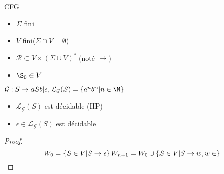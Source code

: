 
\begin{definition} CFG
	\begin{itemize}
		\item $\Sigma$ fini
		\item $V$ fini($\Sigma \cap V = \emptyset$)
		\item $\mathcal R \subset V\times \left(\Sigma \cup V\right)^*$ (noté $\to$)
		\item $\S_0 \in V$
	\end{itemize}
\end{definition}

\begin{example}
	$\mathcal G : S \to aSb | \epsilon, \, \mathcal L_{\mathcal G}(S) =\left\{a^nb^n | n\in \N\right\}$
\end{example}

\begin{proposition}
	\begin{itemize}
		\item $\mathcal L_{\mathcal G}(S)$ est décidable (HP)
		\item $\epsilon \in \mathcal L_{\mathcal G}(S)$ est décidable
	\end{itemize}
\end{proposition}

\begin{proof}
	$$
	W_0 = \left\{ S \in V | S\to \epsilon\right\} \\
	W_{n+1} = W_0 \cup \left\{S \in V | S \to w, w \in \right\}
	$$
\end{proof}